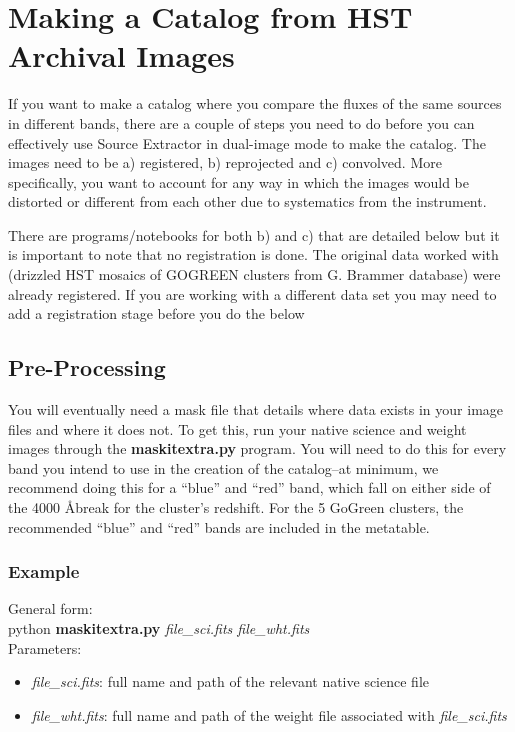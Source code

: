 \documentclass[a4paper,10pt]{article}
\begin{document}
\section{Making a Catalog from HST Archival Images}

If you want to make a catalog where you compare the fluxes of the same sources in different bands, there are a couple of steps you need to do before you can effectively use Source Extractor in dual-image mode to make the catalog. The images need to be a) registered, b) reprojected and c) convolved. More specifically, you want to account for any way in which the images would be distorted or different from each other due to systematics from the instrument. 

There are programs/notebooks for both b) and c) that are detailed below but it is important to note that no registration is done. The original data worked with (drizzled HST mosaics of GOGREEN clusters from G. Brammer database) were already registered. If you are working with a different data set you may need to add a registration stage before you do the below

\subsection{Pre-Processing}

You will eventually need a mask file that details where data exists in your image files and where it does not. To get this, run your native science and weight images through the \textbf{maskitextra.py} program. You will need to do this for every band you intend to use in the creation of the catalog--at minimum, we recommend doing this for a ``blue'' and ``red'' band, which fall on either side of the 4000 \AA  break for the cluster's redshift. For the 5 GoGreen clusters, the recommended ``blue'' and ``red'' bands are included in the metatable.

\subsubsection*{Example}

General form: \\
python \textbf{maskitextra.py} \textit{file\_sci.fits file\_wht.fits} \\

\noindent Parameters:
\begin{itemize}
    \setlength{\itemsep}{-5pt}
    \item \textit{file\_sci.fits}: full name and path of the relevant native science file
    \item \textit{file\_wht.fits}: full name and path of the weight file associated with \textit{file\_sci.fits}
\end{itemize}
\end{document}
